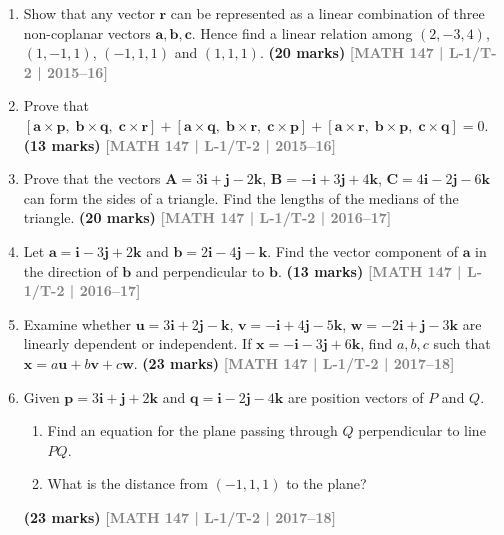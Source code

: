 \documentclass[12pt,a4paper]{article}
\newcommand{\yr}[1]{\hfill\textcolor{gray}{\small\textbf{[#1]}}}
\newcommand{\mk}[1]{\textcolor{orange!70!black}{\small\textbf{(#1 marks)}}}
\begin{document}
\begin{enumerate}

\item Show that any vector $\mathbf{r}$ can be represented as a linear combination of three non-coplanar vectors $\mathbf{a},\mathbf{b},\mathbf{c}$. Hence find a linear relation among $(2,-3,4)$, $(1,-1,1)$, $(-1,1,1)$ and $(1,1,1)$.
\mk{20} \yr{MATH 147 | L-1/T-2 | 2015--16}

\item Prove that $[\mathbf{a}\times\mathbf{p},\;\mathbf{b}\times\mathbf{q},\;\mathbf{c}\times\mathbf{r}]+[\mathbf{a}\times\mathbf{q},\;\mathbf{b}\times\mathbf{r},\;\mathbf{c}\times\mathbf{p}]+[\mathbf{a}\times\mathbf{r},\;\mathbf{b}\times\mathbf{p},\;\mathbf{c}\times\mathbf{q}]=0$.
\mk{13} \yr{MATH 147 | L-1/T-2 | 2015--16}

\item Prove that the vectors $\mathbf{A}=3\mathbf{i}+\mathbf{j}-2\mathbf{k}$, $\mathbf{B}=-\mathbf{i}+3\mathbf{j}+4\mathbf{k}$, $\mathbf{C}=4\mathbf{i}-2\mathbf{j}-6\mathbf{k}$ can form the sides of a triangle. Find the lengths of the medians of the triangle.
\mk{20} \yr{MATH 147 | L-1/T-2 | 2016--17}

\item Let $\mathbf{a}=\mathbf{i}-3\mathbf{j}+2\mathbf{k}$ and $\mathbf{b}=2\mathbf{i}-4\mathbf{j}-\mathbf{k}$. Find the vector component of $\mathbf{a}$ in the direction of $\mathbf{b}$ and perpendicular to $\mathbf{b}$.
\mk{13} \yr{MATH 147 | L-1/T-2 | 2016--17}

\item Examine whether $\mathbf{u}=3\mathbf{i}+2\mathbf{j}-\mathbf{k}$, $\mathbf{v}=-\mathbf{i}+4\mathbf{j}-5\mathbf{k}$, $\mathbf{w}=-2\mathbf{i}+\mathbf{j}-3\mathbf{k}$ are linearly dependent or independent. If $\mathbf{x}=-\mathbf{i}-3\mathbf{j}+6\mathbf{k}$, find $a,b,c$ such that $\mathbf{x}=a\mathbf{u}+b\mathbf{v}+c\mathbf{w}$.
\mk{23} \yr{MATH 147 | L-1/T-2 | 2017--18}

\item Given $\mathbf{p}=3\mathbf{i}+\mathbf{j}+2\mathbf{k}$ and $\mathbf{q}=\mathbf{i}-2\mathbf{j}-4\mathbf{k}$ are position vectors of $P$ and $Q$.
\begin{enumerate}
  \item Find an equation for the plane passing through $Q$ perpendicular to line $PQ$.
  \item What is the distance from $(-1,1,1)$ to the plane?
\end{enumerate}
\mk{23} \yr{MATH 147 | L-1/T-2 | 2017--18}


\end{enumerate}
\end{document}
